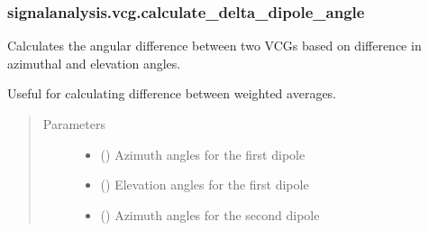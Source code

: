 \documentclass[letterpaper,10pt,english]{sphinxmanual}
\begin{document}
\subsubsection{signalanalysis.vcg.calculate\_delta\_dipole\_angle}
\label{\detokenize{_autosummary/signalanalysis.vcg.calculate_delta_dipole_angle:signalanalysis-vcg-calculate-delta-dipole-angle}}\label{\detokenize{_autosummary/signalanalysis.vcg.calculate_delta_dipole_angle::doc}}

\begin{fulllineitems}
\label{\detokenize{_autosummary/signalanalysis.vcg.calculate_delta_dipole_angle:signalanalysis.vcg.calculate_delta_dipole_angle}}
\sphinxAtStartPar
Calculates the angular difference between two VCGs based on difference in azimuthal and elevation angles.

\sphinxAtStartPar
Useful for calculating difference between weighted averages.
\begin{quote}\begin{description}
\item[{Parameters}] \leavevmode\begin{itemize}
\item {} 
\sphinxAtStartPar
{} () \textendash{} Azimuth angles for the first dipole

\item {} 
\sphinxAtStartPar
{} () \textendash{} Elevation angles for the first dipole

\item {} 
\sphinxAtStartPar
{} () \textendash{} Azimuth angles for the second dipole


\end{itemize}
\end{description}
\end{quote}
\end{fulllineitems}
\end{document}
